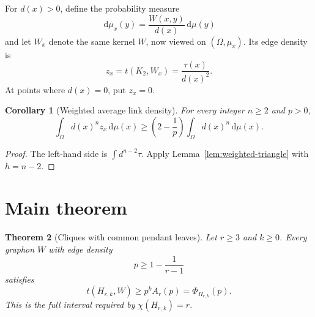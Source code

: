 \documentclass[11pt]{article}
\newtheorem{theorem}{Theorem}[section]
\newtheorem{corollary}[theorem]{Corollary}
\newcommand{\dd}{\,\mathrm{d}}
\begin{document}
For $d(x)>0$, define the probability measure
\[
\dd\mu_x(y)=\frac{W(x,y)}{d(x)}\dd\mu(y)
\]
and let $W_x$ denote the same kernel $W$, now viewed on
$(\Omega,\mu_x)$.  Its edge density is
\[
z_x=t(K_2,W_x)=\frac{\tau(x)}{d(x)^2}.
\]
At points where $d(x)=0$, put $z_x=0$.

\begin{corollary}[Weighted average link density]
\label{cor:link-average}
For every integer $n\geq2$ and $p>0$,
\[
\int_\Omega d(x)^nz_x\dd\mu(x)
\geq
\left(2-\frac1p\right)
\int_\Omega d(x)^n\dd\mu(x).
\]
\end{corollary}

\begin{proof}
The left-hand side is $\int d^{n-2}\tau$.  Apply
Lemma~\ref{lem:weighted-triangle} with $h=n-2$.
\end{proof}


\section{Main theorem}

\begin{theorem}[Cliques with common pendant leaves]
\label{thm:main}
Let $r\geq3$ and $k\geq0$.  Every graphon $W$ with edge density
\[
p\geq1-\frac1{r-1}
\]
satisfies
\[
\boxed{
t(H_{r,k},W)
\geq
p^kA_r(p)
=\Phi_{H_{r,k}}(p).
}
\]
This is the full interval required by $\chi(H_{r,k})=r$.
\end{theorem}
\end{document}
